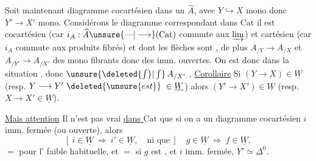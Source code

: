 Soit maintenant
diagramme cocartésien dans un $\widehat A$, avec $Y\hookrightarrow X$ mono donc
$Y'\longrightarrow X'$ mono. 
Considérons le diagramme  correspondant dans $\mathrm{Cat}$
il est cocartésien (car $i_A:\widehat A\unsure{\mathbin{\text{---}}|\longrightarrow}(\mathrm{Cat})$ commute aux
$\varinjlim$) et cartésien (car $i_A$ commute aux produits fibrés) et dont les flèches
sont , de plus $A_{/Y}\longrightarrow A_{/X}$ et
$A_{/Y'}\longrightarrow A_{/X'}$  des mono fibrants donc des imm. ouvertes.
On est donc dans la situation , donc
$\unsure{\deleted{\int}|\int}\,A_{/X'}$ 
,
\uline{Corollaire} Si $(Y\longrightarrow X)\in\underline W$
(resp. $Y\longrightarrow Y'\ \deleted{\unsure{est}}\ \in\underline W$)
alors $(Y'\longrightarrow X')\in\underline W$
(resp. $X\longrightarrow X'\in\underline W$).


\uline{Mais attention} Il n'est pas vrai \uline{dans $\mathrm{Cat}$} que si on a un diagramme
cocartésien
$i$ imm. fermée (ou ouverte), alors
\[
[\ i\in\underline W\ \Longrightarrow\ i'\in\underline W,\quad\text{ni que}\ ]\quad
 g\in\underline W\ \Longrightarrow\ f\in\underline W,
\]
$=$ pour l' faible habituelle, et $=$
si $g$ est , 
et $i$  imm. fermée, $Y'\simeq\Delta^0$.

